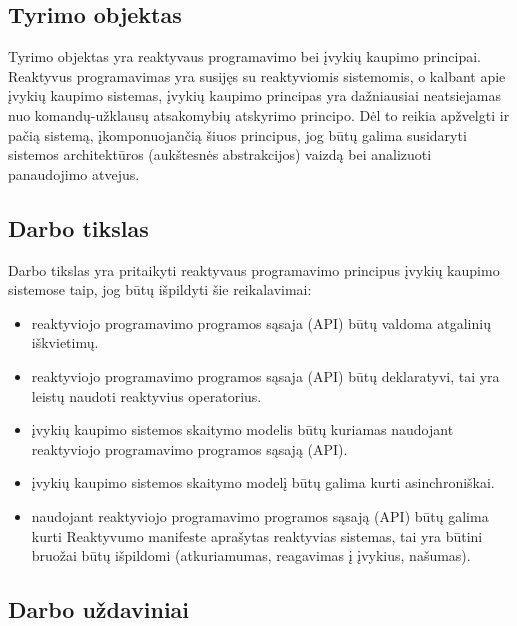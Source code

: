 \subsection{Tyrimo objektas}

    Tyrimo objektas yra reaktyvaus programavimo bei įvykių kaupimo principai. Reaktyvus programavimas yra susijęs su reaktyviomis sistemomis, o kalbant apie įvykių kaupimo sistemas, įvykių kaupimo principas yra dažniausiai neatsiejamas nuo komandų-užklausų atsakomybių atskyrimo principo. Dėl to reikia apžvelgti ir pačią sistemą, įkomponuojančią šiuos principus, jog būtų galima susidaryti sistemos architektūros (aukštesnės abstrakcijos) vaizdą bei analizuoti panaudojimo atvejus.

\subsection{Darbo tikslas}

  Darbo tikslas yra pritaikyti reaktyvaus programavimo principus įvykių kaupimo sistemose taip, jog būtų išpildyti šie reikalavimai:

  \begin{itemize}

    \item reaktyviojo programavimo programos sąsaja (API) būtų valdoma atgalinių iškvietimų.

    \item reaktyviojo programavimo programos sąsaja (API) būtų deklaratyvi, tai yra leistų naudoti reaktyvius operatorius.

    \item įvykių kaupimo sistemos skaitymo modelis būtų kuriamas naudojant reaktyviojo programavimo programos sąsają (API).

    \item įvykių kaupimo sistemos skaitymo modelį būtų galima kurti asinchroniškai.

    \item naudojant reaktyviojo programavimo programos sąsają (API) būtų galima kurti Reaktyvumo manifeste aprašytas reaktyvias sistemas, tai yra būtini bruožai būtų išpildomi (atkuriamumas, reagavimas į įvykius, našumas).

\end{itemize}

\subsection{Darbo uždaviniai}

